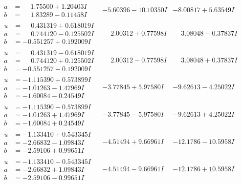 \documentclass[1p]{elsarticle_modified}
\theoremstyle{definition}
\begin{document}
$$\begin{array}{c|c|c}
\begin{aligned}
a &= \phantom{-}1.75500 + 1.20403 I \\
b &= \phantom{-}1.83289 - 0.11458 I\end{aligned}
 & -5.60396 - 10.10350 I & -8.00817 + 5.63549 I \\ \hline\begin{aligned}
u &= \phantom{-}0.431319 + 0.618019 I \\
a &= \phantom{-}0.744120 - 0.125502 I \\
b &= -0.551257 + 0.192009 I\end{aligned}
 & \phantom{-}2.00312 + 0.77598 I & \phantom{-}3.08048 - 0.37837 I \\ \hline\begin{aligned}
u &= \phantom{-}0.431319 - 0.618019 I \\
a &= \phantom{-}0.744120 + 0.125502 I \\
b &= -0.551257 - 0.192009 I\end{aligned}
 & \phantom{-}2.00312 - 0.77598 I & \phantom{-}3.08048 + 0.37837 I \\ \hline\begin{aligned}
u &= -1.115390 + 0.573899 I \\
a &= -1.01263 - 1.47969 I \\
b &= -1.60084 - 0.24549 I\end{aligned}
 & -3.77845 + 5.97580 I & -9.62613 - 4.25022 I \\ \hline\begin{aligned}
u &= -1.115390 - 0.573899 I \\
a &= -1.01263 + 1.47969 I \\
b &= -1.60084 + 0.24549 I\end{aligned}
 & -3.77845 - 5.97580 I & -9.62613 + 4.25022 I \\ \hline\begin{aligned}
u &= -1.133410 + 0.543345 I \\
a &= -2.66832 - 1.09843 I \\
b &= -2.59106 + 0.99651 I\end{aligned}
 & -4.51494 + 9.66961 I & -12.1786 - 10.5958 I \\ \hline\begin{aligned}
u &= -1.133410 - 0.543345 I \\
a &= -2.66832 + 1.09843 I \\
b &= -2.59106 - 0.99651 I\end{aligned}
 & -4.51494 - 9.66961 I & -12.1786 + 10.5958 I \\ \hline\begin{aligned}

\end{aligned}
\end{array}$$
\end{document}
